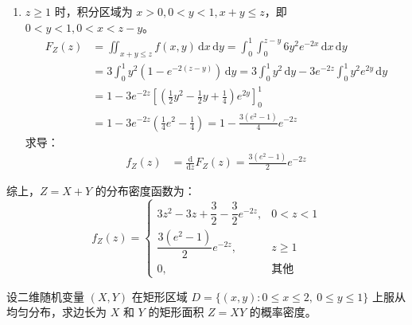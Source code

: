 ﻿\documentclass[lang=cn,11pt]{elegantbook}
\begin{document}
\begin{solution}
\begin{enumerate}
    \item $z \geqslant 1$ 时，积分区域为 $x>0, 0<y<1, x+y \leqslant z$，即 $0 < y < 1, 0 < x < z-y$。
\begin{align*}
    F_Z(z) &= \iint_{x+y\leqslant z} f(x,y) \,\mathrm{d}x\,\mathrm{d}y = \int_0^1 \int_0^{z-y} 6y^2 e^{-2x} \,\mathrm{d}x\,\mathrm{d}y \\
    &= 3 \int_0^1 y^2 \left( 1 - e^{-2(z-y)} \right) \,\mathrm{d}y = 3 \int_0^1 y^2 \,\mathrm{d}y - 3e^{-2z} \int_0^1 y^2 e^{2y} \,\mathrm{d}y \\
    &= 1 - 3e^{-2z} \left[ \left( \frac{1}{2}y^2 - \frac{1}{2}y + \frac{1}{4} \right) e^{2y} \right]_0^1 \\
    &= 1 - 3e^{-2z} \left( \frac{1}{4}e^2 - \frac{1}{4} \right) = 1 - \frac{3(e^2-1)}{4}e^{-2z}
\end{align*}
求导：
\begin{align*}
    f_Z(z) &= \frac{\mathrm{d}}{\mathrm{d}z} F_Z(z) = \frac{3(e^2-1)}{2}e^{-2z}
\end{align*}
\end{enumerate}
综上，$Z = X + Y$ 的分布密度函数为：
\[
f_Z(z) = \begin{cases} 3z^2 - 3z + \dfrac{3}{2} - \dfrac{3}{2}e^{-2z}, & 0 < z < 1 \\ \dfrac{3(e^2-1)}{2}e^{-2z}, & z \geqslant 1 \\ 0, & \text{其他} \end{cases}
\]
\end{solution}

\begin{exercise} \label{exer:3-8c}
设二维随机变量 $(X,Y)$ 在矩形区域 $D = \{(x,y) : 0 \leqslant x \leqslant 2,\ 0 \leqslant y \leqslant 1\}$ 上服从均匀分布，求边长为 $X$ 和 $Y$ 的矩形面积 $Z = XY$ 的概率密度。
\end{exercise}
\end{document}
